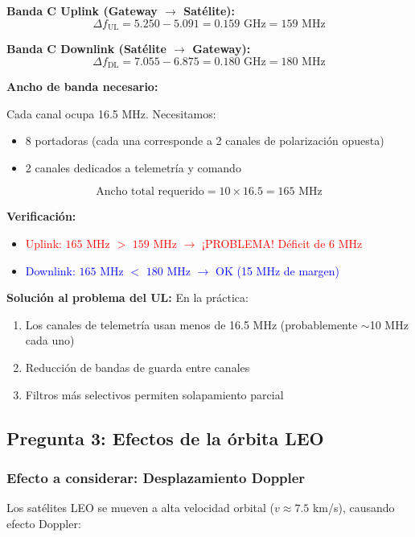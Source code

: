 \documentclass[a4paper,11pt]{article}
\begin{document}
\textbf{Banda C Uplink (Gateway $\rightarrow$ Satélite):}
$$\Delta f_{\text{UL}} = 5.250 - 5.091 = 0.159 \text{ GHz} = 159 \text{ MHz}$$

\textbf{Banda C Downlink (Satélite $\rightarrow$ Gateway):}
$$\Delta f_{\text{DL}} = 7.055 - 6.875 = 0.180 \text{ GHz} = 180 \text{ MHz}$$

\textbf{Ancho de banda necesario:}

Cada canal ocupa 16.5 MHz. Necesitamos:
\begin{itemize}
    \item 8 portadoras (cada una corresponde a 2 canales de polarización opuesta)
    \item 2 canales dedicados a telemetría y comando
\end{itemize}

$$\text{Ancho total requerido} = 10 \times 16.5 = 165 \text{ MHz}$$

\textbf{Verificación:}
\begin{itemize}
    \item \textcolor{red}{Uplink: $165$ MHz $>$ $159$ MHz $\rightarrow$ ¡PROBLEMA! Déficit de 6 MHz}
    \item \textcolor{blue}{Downlink: $165$ MHz $<$ $180$ MHz $\rightarrow$ OK (15 MHz de margen)}
\end{itemize}

\textbf{Solución al problema del UL:} En la práctica:
\begin{enumerate}
    \item Los canales de telemetría usan menos de 16.5 MHz (probablemente $\sim$10 MHz cada uno)
    \item Reducción de bandas de guarda entre canales
    \item Filtros más selectivos permiten solapamiento parcial
\end{enumerate}

\subsection*{Pregunta 3: Efectos de la órbita LEO}

\subsubsection*{Efecto a considerar: Desplazamiento Doppler}

Los satélites LEO se mueven a alta velocidad orbital ($v \approx 7.5$ km/s), causando efecto Doppler:
\end{document}
